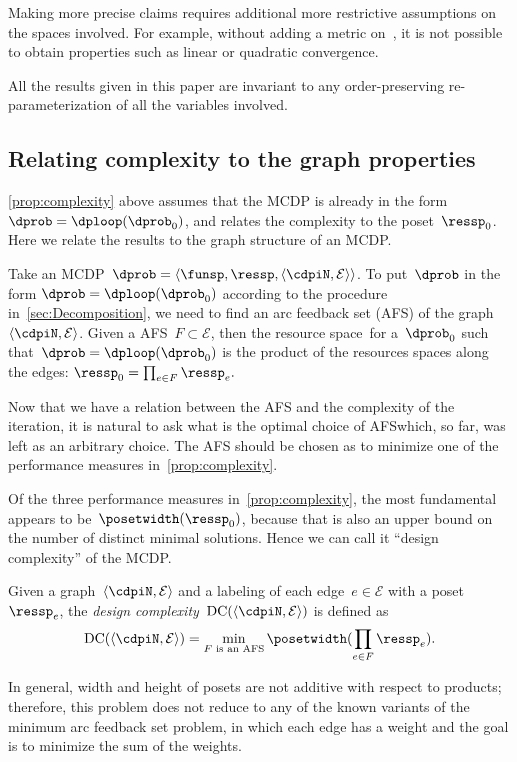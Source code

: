 \begin{remark}
  Making more precise claims requires additional more restrictive assumptions
  on the spaces involved. For example, without adding a metric on~\ressp,
  it is not possible to obtain properties such as linear or quadratic
  convergence.
\end{remark}

\begin{remark}
  All the results given in this paper are invariant to any order-preserving
  re-parameterization of all the variables involved.
\end{remark}

\subsection{Relating complexity to the graph properties}

\cref{prop:complexity} above assumes that the MCDP is already in the form $\dprob=\dploop(\dprob_{0})$, and relates the complexity to
the poset~$\ressp_{0}$.
Here we relate the results to the graph structure of an MCDP.

Take an MCDP~$\dprob=\left\langle \funsp,\ressp,\left\langle \cdpiN,\mathcal{E}\right\rangle \right\rangle $.
To put~$\dprob$ in the form $\dprob=\dploop(\dprob_{0})$ according
to the procedure in~\cref{sec:Decomposition}, we need to find an arc
feedback set (AFS) of the graph~$\left\langle \cdpiN,\mathcal{E}\right\rangle $.
Given a AFS~$F\subset\mathcal{E}$, then the resource space~\ressp for a~$\dprob_{0}$ such that~$\dprob=\dploop(\dprob_{0})$ is the product of the resources spaces along the edges: $\ressp_{0}=\prod_{e\in F}\ressp_{e}.$

Now that we have a relation between the AFS and the complexity of the iteration, it is natural to ask what is the optimal choice of AFS\textemdash which, so far, was left as an arbitrary choice.
The AFS should be chosen as to minimize one of the performance measures in~\cref{prop:complexity}.

Of the three performance measures in~\cref{prop:complexity}, the most fundamental appears to be~$\posetwidth(\ressp_{0})$, because that is also an upper bound on the number of distinct minimal solutions.
Hence we can call it ``design complexity'' of the MCDP.
\begin{definition}
  \label{def:design-complexity}Given a graph~$\left\langle \cdpiN,\mathcal{E}\right\rangle $
  and a labeling of each edge~$e\in\mathcal{E}$ with a poset~$\ressp_{e}$,
  the \emph{design complexity~}$\text{DC}(\left\langle \cdpiN,\mathcal{E}\right\rangle )$
  is defined as
  \begin{equation}
    \text{DC}(\left\langle \cdpiN,\mathcal{E}\right\rangle )=\min_{F\text{ is an AFS}}\posetwidth(\prod_{e\in F}\ressp_{e}).\label{eq:complexity}
  \end{equation}
\end{definition}
In general, width and height of posets are not additive with respect
to products; therefore, this problem does not reduce to any of the
known variants of the minimum arc feedback set problem, in which
each edge has a weight and the goal is to minimize the sum of the
weights.

